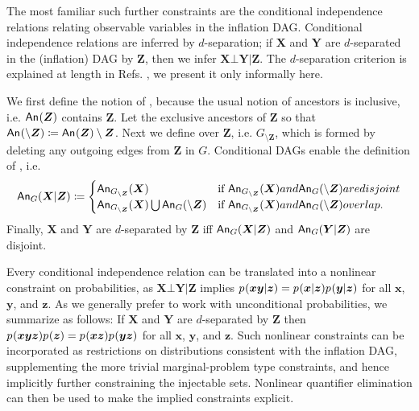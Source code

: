 \begin{asparadesc}
\medskip\item[\tred{Conditional Independence Relations}] \noindent
\par\hspace{\parskip} 
The most familiar such further constraints are the conditional independence relations relating observable variables in the inflation DAG. Conditional independence relations are inferred by $d$-separation; if $\bm{X}$ and $\bm{Y}$ are $d$-separated in the (inflation) DAG by $\bm{Z}$, then we infer $\bm{X}\bot\bm{Y}|\bm{Z}$. The $d$-separation criterion is explained at length in Refs. \cite{pearl2009causality,studeny2005probabilistic,WoodSpekkens,pusey2014gdag}, we present it only informally here.

We first define the notion of , because the usual notion of ancestors is inclusive, i.e. $\An{\bm{Z}}$ contains $\bm{Z}$. Let the exclusive ancestors of $\bm{Z}$ so that $\An{\setminus\bm{Z}}\coloneqq\An{\bm{Z}}\setminus\bm{Z}$. Next we define  over $\bm{Z}$, i.e. $G_{\setminus\bm{Z}}$, which is formed by deleting any outgoing edges from $\bm{Z}$ in $G$. Conditional DAGs enable the definition of , i.e. 
\begin{align}
    \An[G]{\bm{X}|\bm{Z}}\coloneqq \begin{cases}
    \An[G_{\setminus\bm{Z}}]{\bm{X}}& \text{if } \An[G_{\setminus\bm{Z}}]{\bm{X}} and \An[G]{\setminus\bm{Z}} are disjoint\\
    \An[G_{\setminus\bm{Z}}]{\bm{X}} \bigcup \An[G]{\setminus\bm{Z}} & \text{if } \An[G_{\setminus\bm{Z}}]{\bm{X}} and \An[G]{\setminus\bm{Z}} overlap.
    \end{cases}
\end{align}
Finally, $\bm{X}$ and $\bm{Y}$ are $d$-separated by $\bm{Z}$ iff $\An[G]{\bm{X}|\bm{Z}}$ and $\An[G]{\bm{Y}|\bm{Z}}$ are disjoint.

Every conditional independence relation can be translated into a nonlinear constraint on probabilities, as $\bm{X}\bot\bm{Y}|\bm{Z}$ implies $\p{\bm{x}\bm{y}|\bm{z}}=\p{\bm{x}|\bm{z}}\p{\bm{y}|\bm{z}}$ for all $\bm{x}$, $\bm{y}$, and $\bm{z}$. As we generally prefer to work with unconditional probabilities, we summarize as follows: If $\bm{X}$ and $\bm{Y}$ are $d$-separated by $\bm{Z}$ then $\p{\bm{x}\bm{y}\bm{z}}\p{\bm{z}}=\p{\bm{x}\bm{z}}\p{\bm{y}\bm{z}}$ for all $\bm{x}$, $\bm{y}$, and $\bm{z}$. Such nonlinear constraints can be incorporated as restrictions on distributions consistent with the inflation DAG, supplementing the more trivial marginal-problem type constraints, and hence implicitly further constraining the injectable sets. Nonlinear quantifier elimination can then be used to make the implied constraints explicit.


\end{asparadesc}

